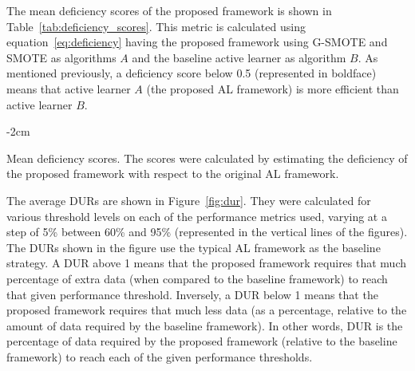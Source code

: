 \documentclass[preprint,12pt]{elsarticle}
\begin{document}
The mean deficiency scores of the proposed framework is shown in
Table~\ref{tab:deficiency_scores}. This metric is calculated using
equation~\ref{eq:deficiency} having the proposed
framework using G-SMOTE and SMOTE as algorithms $A$ and the baseline active
learner as algorithm $B$. As mentioned previously, a deficiency score below
0.5 (represented in boldface) means that active learner $A$ (the proposed AL
framework) is more efficient than active learner $B$.

\begin{table}[H]
    \centering
    \addtolength{\leftskip} {-2cm}
    \addtolength{\rightskip}{-2cm}
    \caption{\label{tab:deficiency_scores}
        Mean deficiency scores. The scores were calculated by estimating the
        deficiency of the proposed framework with respect to the original AL
        framework.
    }
\end{table}

The average DURs are shown in Figure~\ref{fig:dur}. They were calculated for
various threshold levels on each of the performance metrics used, varying at a
step of 5\% between 60\% and 95\% (represented in the vertical lines of the
figures). The DURs shown in the figure use the typical AL framework as the
baseline strategy. A DUR above 1 means that the proposed framework requires
that much percentage of extra data (when compared to the baseline framework)
to reach that given performance threshold. Inversely, a DUR below 1 means that
the proposed framework requires that much less data (as a percentage, relative
to the amount of data required by the baseline framework). In other words, DUR
is the percentage of data required by the proposed framework (relative to the
baseline framework) to reach each of the given performance thresholds.
\end{document}
